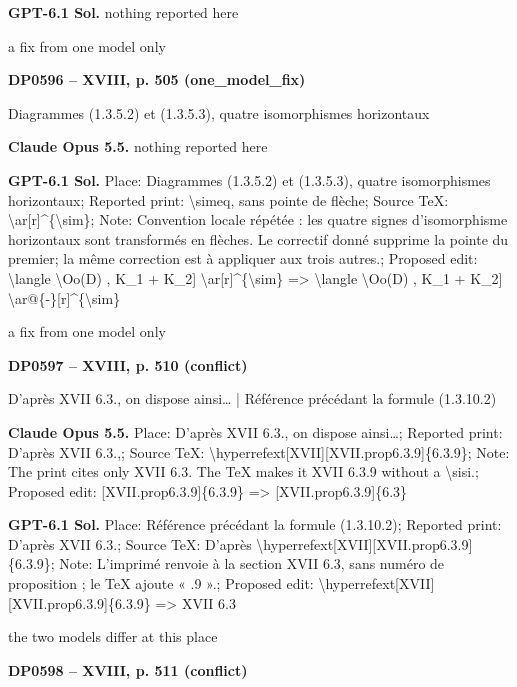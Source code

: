\textbf{GPT-6.1 Sol.} nothing reported here\par
a fix from one model only\par
\par\noindent\hypertarget{DP0596}{}\textbf{DP0596 -- XVIII, p. 505 (one\_model\_fix)}\par
Diagrammes (1.3.5.2) et (1.3.5.3), quatre isomorphismes horizontaux\par
\textbf{Claude Opus 5.5.} nothing reported here\par
\textbf{GPT-6.1 Sol.} Place: Diagrammes (1.3.5.2) et (1.3.5.3), quatre isomorphismes horizontaux; Reported print: \textbackslash{}simeq, sans pointe de flèche; Source TeX: \textbackslash{}ar[r]\textasciicircum{}\{\textbackslash{}sim\}; Note: Convention locale répétée : les quatre signes d'isomorphisme horizontaux sont transformés en flèches. Le correctif donné supprime la pointe du premier; la même correction est à appliquer aux trois autres.; Proposed edit: \textbackslash{}langle \textbackslash{}Oo(D) , K\_1 + K\_2] \textbackslash{}ar[r]\textasciicircum{}\{\textbackslash{}sim\} =\allowbreak > \textbackslash{}langle \textbackslash{}Oo(D) , K\_1 + K\_2] \textbackslash{}ar@\{-\}[r]\textasciicircum{}\{\textbackslash{}sim\}\par
a fix from one model only\par
\par\noindent\hypertarget{DP0597}{}\textbf{DP0597 -- XVIII, p. 510 (conflict)}\par
D'après XVII 6.3., on dispose ainsi… | Référence précédant la formule (1.3.10.2)\par
\textbf{Claude Opus 5.5.} Place: D'après XVII 6.3., on dispose ainsi…; Reported print: D'après XVII 6.3.,; Source TeX: \textbackslash{}hyperrefext[XVII][XVII.prop6.3.9]\{6.3.9\}; Note: The print cites only XVII 6.3. The TeX makes it XVII 6.3.9 without a \textbackslash{}sisi.; Proposed edit: [XVII.prop6.3.9]\{6.3.9\} =\allowbreak > [XVII.prop6.3.9]\{6.3\}\par
\textbf{GPT-6.1 Sol.} Place: Référence précédant la formule (1.3.10.2); Reported print: D'après XVII 6.3.; Source TeX: D'après \textbackslash{}hyperrefext[XVII][XVII.prop6.3.9]\{6.3.9\}; Note: L'imprimé renvoie à la section XVII 6.3, sans numéro de proposition ; le TeX ajoute « .9 ».; Proposed edit: \textbackslash{}hyperrefext[XVII][XVII.prop6.3.9]\{6.3.9\} =\allowbreak > XVII 6.3\par
the two models differ at this place\par
\par\noindent\hypertarget{DP0598}{}\textbf{DP0598 -- XVIII, p. 511 (conflict)}\par
